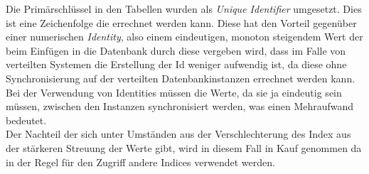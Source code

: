 Die Primärschlüssel in den Tabellen wurden als \emph{Unique Identifier} umgesetzt. Dies ist eine Zeichenfolge die errechnet werden kann. Diese hat den Vorteil gegenüber einer numerischen \emph{Identity}, also einem eindeutigen, monoton steigendem Wert der beim Einfügen in die Datenbank durch diese vergeben wird, dass im Falle von verteilten Systemen die Erstellung der Id weniger aufwendig ist, da diese ohne Synchronisierung auf der verteilten Datenbankinstanzen errechnet werden kann. Bei der Verwendung von Identities müssen die Werte, da sie ja eindeutig sein müssen, zwischen den Instanzen synchronisiert werden, was einen Mehraufwand bedeutet. 
\\Der Nachteil der sich unter Umständen aus der Verschlechterung des Index aus der stärkeren Streuung der Werte gibt, wird in diesem Fall in Kauf genommen da in der Regel für den Zugriff andere Indices verwendet werden.\parencite{ms_guid}
